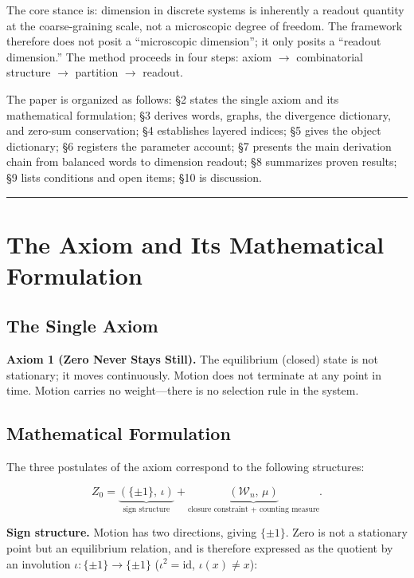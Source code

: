 \documentclass[
  11pt,
]{article}
\begin{document}
The core stance is: dimension in discrete systems is inherently a
readout quantity at the coarse-graining scale, not a microscopic degree
of freedom. The framework therefore does not posit a ``microscopic
dimension''; it only posits a ``readout dimension.'' The method proceeds
in four steps: axiom \(\to\) combinatorial structure \(\to\) partition
\(\to\) readout.

The paper is organized as follows: §2 states the single axiom and its
mathematical formulation; §3 derives words, graphs, the divergence
dictionary, and zero-sum conservation; §4 establishes layered indices;
§5 gives the object dictionary; §6 registers the parameter account; §7
presents the main derivation chain from balanced words to dimension
readout; §8 summarizes proven results; §9 lists conditions and open
items; §10 is discussion.

\begin{center}\rule{0.5\linewidth}{0.5pt}\end{center}

\section{The Axiom and Its Mathematical
Formulation}\label{the-axiom-and-its-mathematical-formulation}

\subsection{The Single Axiom}\label{the-single-axiom}

\textbf{Axiom 1 (Zero Never Stays Still).} The equilibrium (closed)
state is not stationary; it moves continuously. Motion does not
terminate at any point in time. Motion carries no weight---there is no
selection rule in the system.

\subsection{Mathematical
Formulation}\label{mathematical-formulation}

The three postulates of the axiom correspond to the following
structures:

\[
Z_0 = \underbrace{(\{\pm 1\},\,\iota)}_{\text{sign structure}} + \underbrace{(\mathcal{W}_n,\,\mu)}_{\text{closure constraint + counting measure}}.
\tag{2.1}
\]

\textbf{Sign structure.} Motion has two directions, giving
\(\{\pm 1\}\). Zero is not a stationary point but an equilibrium
relation, and is therefore expressed as the quotient by an involution
\(\iota:\{\pm1\}\to\{\pm1\}\) (\(\iota^2=\mathrm{id}\),
\(\iota(x)\neq x\)):
\end{document}
